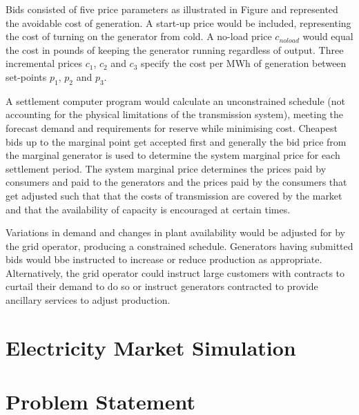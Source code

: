 
Bids consisted of five price parameters as illustrated in Figure
and represented the avoidable cost of generation. A start-up price would be
included, representing the cost of turning on the generator from cold.  A
no-load price $c_{noload}$ would equal the cost in pounds of keeping the
generator running regardless of output. Three incremental prices $c_1$, $c_2$
and $c_3$ specify the cost per MWh of generation between set-points $p_1$,
$p_2$ and $p_3$.

A settlement computer program would calculate an unconstrained schedule (not
accounting for the physical limitations of the transmission system), meeting
the forecast demand and requirements for reserve while minimising cost.
Cheapest bids up to the marginal point get accepted first and generally the bid
price from the marginal generator is used to determine the system marginal
price for each settlement period.  The system marginal price determines the
prices paid by consumers and paid to the generators and the prices paid by the
consumers that get adjusted such that that the costs of transmission are
covered by the market and that the availability of capacity is encouraged at
certain times.

Variations in demand and changes in plant availability would be adjusted for by
the grid operator, producing a constrained schedule.  Generators having
submitted bids would bbe instructed to increase or reduce production as
appropriate.  Alternatively, the grid operator could instruct large customers
with contracts to curtail their demand to do so or instruct generators
contracted to provide ancillary services to adjust production.

\section{Electricity Market Simulation}


\section{Problem Statement}%

